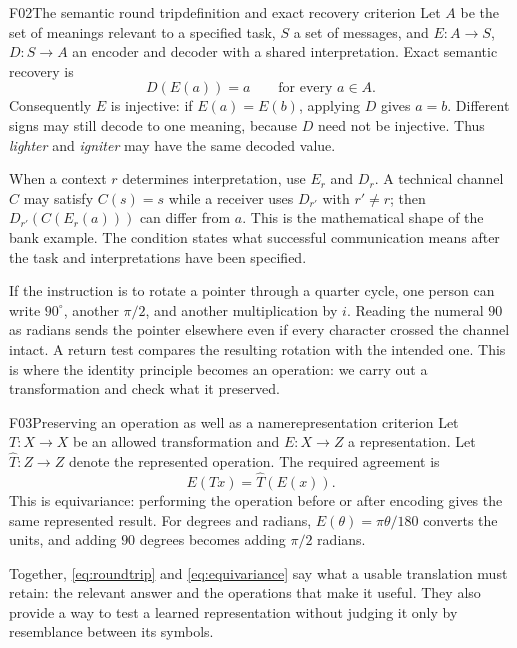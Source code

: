 \documentclass[11pt,a4paper]{article}
\begin{document}
\begin{formal}{F02}{The semantic round trip}{definition and exact recovery criterion}
Let $A$ be the set of meanings relevant to a specified task, $S$ a set of
messages, and $E:A\to S$, $D:S\to A$ an encoder and decoder with a shared
interpretation. Exact semantic recovery is
\begin{equation}\label{eq:roundtrip}
 D(E(a))=a\qquad\text{for every }a\in A.
\end{equation}
Consequently $E$ is injective: if $E(a)=E(b)$, applying $D$ gives $a=b$.
Different signs may still decode to one meaning, because $D$ need not be
injective. Thus \emph{lighter} and \emph{igniter} may have the same decoded value.

When a context $r$ determines interpretation, use $E_r$ and $D_r$. A technical
channel $C$ may satisfy $C(s)=s$ while a receiver uses $D_{r'}$ with $r'\ne r$;
then $D_{r'}(C(E_r(a)))$ can differ from $a$. This is the mathematical shape of
the bank example. The condition states what successful communication means
after the task and interpretations have been specified.
\end{formal}

If the instruction is to rotate a pointer through a quarter cycle, one person
can write $90^\circ$, another $\pi/2$, and another multiplication by $i$.
Reading the numeral $90$ as radians sends the pointer elsewhere even if every
character crossed the channel intact. A return test compares the resulting
rotation with the intended one. This is where the identity principle becomes
an operation: we carry out a transformation and check what it preserved.

\begin{formal}{F03}{Preserving an operation as well as a name}{representation criterion}
Let $T:X\to X$ be an allowed transformation and $E:X\to Z$ a representation.
Let $\widehat T:Z\to Z$ denote the represented operation. The required agreement is
\begin{equation}\label{eq:equivariance}
 E(Tx)=\widehat T(E(x)).
\end{equation}
This is equivariance: performing the operation before or after encoding gives
the same represented result. For degrees and radians,
$E(\theta)=\pi\theta/180$ converts the units, and adding $90$ degrees becomes
adding $\pi/2$ radians.

Together, \eqref{eq:roundtrip} and \eqref{eq:equivariance} say what a usable
translation must retain: the relevant answer and the operations that make it
useful. They also provide a way to test a learned representation without
judging it only by resemblance between its symbols.
\end{formal}
\end{document}
